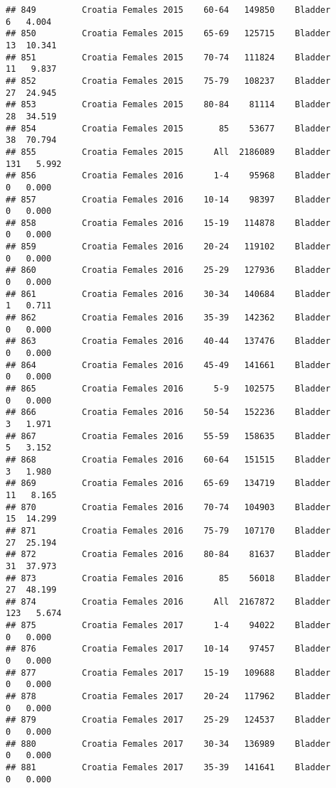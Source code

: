 \documentclass[
]{article}
\begin{document}
\begin{verbatim}
## 849         Croatia Females 2015    60-64   149850    Bladder      6   4.004
## 850         Croatia Females 2015    65-69   125715    Bladder     13  10.341
## 851         Croatia Females 2015    70-74   111824    Bladder     11   9.837
## 852         Croatia Females 2015    75-79   108237    Bladder     27  24.945
## 853         Croatia Females 2015    80-84    81114    Bladder     28  34.519
## 854         Croatia Females 2015       85    53677    Bladder     38  70.794
## 855         Croatia Females 2015      All  2186089    Bladder    131   5.992
## 856         Croatia Females 2016      1-4    95968    Bladder      0   0.000
## 857         Croatia Females 2016    10-14    98397    Bladder      0   0.000
## 858         Croatia Females 2016    15-19   114878    Bladder      0   0.000
## 859         Croatia Females 2016    20-24   119102    Bladder      0   0.000
## 860         Croatia Females 2016    25-29   127936    Bladder      0   0.000
## 861         Croatia Females 2016    30-34   140684    Bladder      1   0.711
## 862         Croatia Females 2016    35-39   142362    Bladder      0   0.000
## 863         Croatia Females 2016    40-44   137476    Bladder      0   0.000
## 864         Croatia Females 2016    45-49   141661    Bladder      0   0.000
## 865         Croatia Females 2016      5-9   102575    Bladder      0   0.000
## 866         Croatia Females 2016    50-54   152236    Bladder      3   1.971
## 867         Croatia Females 2016    55-59   158635    Bladder      5   3.152
## 868         Croatia Females 2016    60-64   151515    Bladder      3   1.980
## 869         Croatia Females 2016    65-69   134719    Bladder     11   8.165
## 870         Croatia Females 2016    70-74   104903    Bladder     15  14.299
## 871         Croatia Females 2016    75-79   107170    Bladder     27  25.194
## 872         Croatia Females 2016    80-84    81637    Bladder     31  37.973
## 873         Croatia Females 2016       85    56018    Bladder     27  48.199
## 874         Croatia Females 2016      All  2167872    Bladder    123   5.674
## 875         Croatia Females 2017      1-4    94022    Bladder      0   0.000
## 876         Croatia Females 2017    10-14    97457    Bladder      0   0.000
## 877         Croatia Females 2017    15-19   109688    Bladder      0   0.000
## 878         Croatia Females 2017    20-24   117962    Bladder      0   0.000
## 879         Croatia Females 2017    25-29   124537    Bladder      0   0.000
## 880         Croatia Females 2017    30-34   136989    Bladder      0   0.000
## 881         Croatia Females 2017    35-39   141641    Bladder      0   0.000

\end{verbatim}
\end{document}
